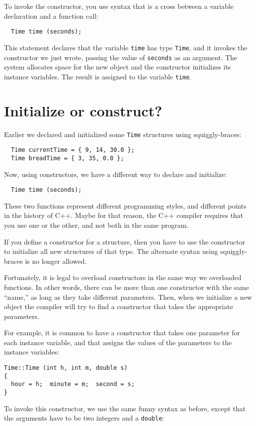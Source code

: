 {To invoke the constructor, you use syntax that is a cross
between a variable declaration and a function call:

\begin{verbatim}
  Time time (seconds);
\end{verbatim}
%
This statement declares that the variable {\tt time} has
type {\tt Time}, and it invokes the constructor we just wrote,
passing the value of {\tt seconds} as an argument.  The system
allocates space for the new object and the constructor initializes
its instance variables.  The result is assigned to the variable
{\tt time}.


\section {Initialize or construct?}

Earlier we declared and initialized some {\tt Time} structures
using squiggly-braces:

\begin{verbatim}
  Time currentTime = { 9, 14, 30.0 };
  Time breadTime = { 3, 35, 0.0 };
\end{verbatim}
%
Now, using constructors, we have a different way to declare
and initialize:

\begin{verbatim}
  Time time (seconds);
\end{verbatim}
%
These two functions represent different programming styles, and
different points in the history of C++.  Maybe
for that reason, the C++ compiler requires that you use one or
the other, and not both in the same program.

If you define a constructor for a structure, then you have to
use the constructor to initialize all new structures of that
type.  The alternate syntax using squiggly-braces is no longer
allowed.

Fortunately, it is legal to overload constructors in the same
way we overloaded functions.  In other words, there can be more
than one constructor with the same ``name,'' as long as they
take different parameters.  Then, when we initialize a new object
the compiler will try to find a constructor that takes the
appropriate parameters.

For example, it is common to have a constructor that takes
one parameter for each instance variable, and that assigns
the values of the parameters to the instance variables:

\begin{verbatim}
Time::Time (int h, int m, double s)
{
  hour = h;  minute = m;  second = s;
}
\end{verbatim}
%
To invoke this constructor, we use the same funny syntax
as before, except that the arguments have to be two integers
and a {\tt double}:

}
